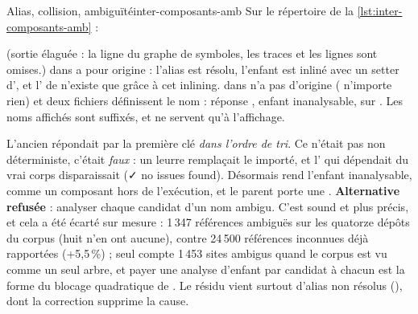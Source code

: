 \begin{exemple}{Alias, collision, ambiguïté}{inter-composants-amb}
Sur le répertoire de la \cref{lst:inter-composants-amb} :
(sortie élaguée : la ligne du graphe de symboles, les traces et les lignes  sont
omises.)  dans  a pour origine  : l'alias
est résolu, l'enfant est inliné avec un setter d', et l'\Error{} de
 n'existe que grâce à cet inlining.  dans  n'a pas
d'origine ( n'importe rien) et deux fichiers définissent le nom : réponse
, enfant inanalysable, \Info{} sur . Les noms affichés sont suffixés,
et ne servent qu'à l'affichage.
\end{exemple}

\begin{decision}
L'ancien  répondait par la première clé  \emph{dans l'ordre
de tri}. Ce n'était pas non déterministe, c'était \emph{faux} : un leurre 
remplaçait le  importé, et l'\Error{} qui dépendait du vrai corps disparaissait
(\og ✓ no issues found\fg). Désormais  rend l'enfant inanalysable, comme un
composant hors de l'exécution, et le parent porte une \Info{} .
\textbf{Alternative refusée} : analyser chaque candidat d'un nom ambigu. C'est sound et plus
précis, et cela a été écarté sur mesure : 1\,347 références ambiguës sur les quatorze dépôts du
corpus (huit n'en ont aucune), contre 24\,500 références inconnues déjà rapportées (+5,5\,\%) ;
 seul compte 1\,453 sites ambigus quand le corpus est vu comme un seul arbre, et
payer une analyse d'enfant par candidat à chacun est la forme du blocage quadratique de
. Le résidu vient surtout d'alias  non résolus (), dont
la correction supprime la cause.
\end{decision}

